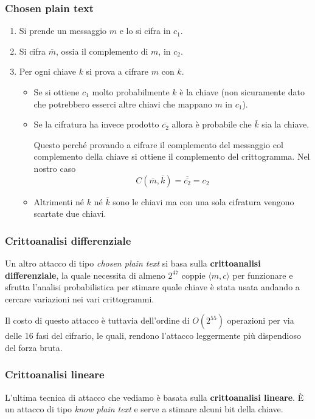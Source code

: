 \subsubsection{Chosen plain text}
\begin{enumerate}
	\item Si prende un messaggio $m$ e lo si cifra in $c_1$.
	\item Si cifra $\overline{m}$, ossia il complemento di $m$, in $c_2$.
	\item Per ogni chiave $k$ si prova a cifrare $m$ con $k$.
	      \begin{itemize}
		      \item Se si ottiene $c_1$ molto probabilmente $k$ \`e la chiave (non sicuramente dato che potrebbero
		            esserci altre chiavi che mappano $m$ in $c_1$).
		      \item Se la cifratura ha invece prodotto $\overline{c_2}$ allora \`e probabile che $\overline{k}$ sia
		            la chiave.

		            Questo perch\'e provando a cifrare il complemento del messaggio col complemento della chiave si
		            ottiene il complemento del crittogramma. Nel nostro caso
		            \[ C(\overline{m}, \overline{k}) = \overline{\overline{c_2}} = c_2 \]
		      \item Altrimenti n\'e $k$ n\'e $\overline{k}$ sono le chiavi ma con una sola cifratura vengono scartate
		            due chiavi.
	      \end{itemize}
\end{enumerate}

\subsubsection{Crittoanalisi differenziale}
Un altro attacco di tipo \emph{chosen plain text} si basa sulla \textbf{crittoanalisi differenziale}, la quale necessita
di almeno $2^{47}$ coppie $\langle m, c \rangle$ per funzionare e sfrutta l'analisi probabilistica per stimare quale
chiave \`e stata usata andando a cercare variazioni nei vari crittogrammi.

Il costo di questo attacco \`e tuttavia dell'ordine di $O(2^{55})$ operazioni per via delle 16 fasi del cifrario, le
quali, rendono l'attacco leggermente pi\`u dispendioso del forza bruta.

\subsubsection{Crittoanalisi lineare}
L'ultima tecnica di attacco che vediamo \`e basata sulla \textbf{crittoanalisi lineare}. \`E un attacco di tipo
\emph{know plain text} e serve a stimare alcuni bit della chiave.

